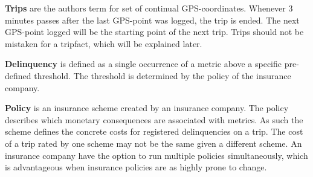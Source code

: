 \textbf{Trips} are the authors term for set of continual GPS-coordinates. Whenever 3 minutes passes after the last GPS-point was logged, the trip is ended. The next GPS-point logged will be the starting point of the next trip. Trips should not be mistaken for a tripfact, which will be explained later.

\textbf{Delinquency} is defined as a single occurrence of a metric above a specific pre-defined threshold. The threshold is determined by the policy of the insurance company.

\textbf{Policy} is an insurance scheme created by an insurance company. The policy describes which monetary consequences are associated with metrics. As such the scheme defines the concrete costs for registered delinquencies on a trip. The cost of a trip rated by one scheme may not be the same given a different scheme. An insurance company have the option to run multiple policies simultaneously, which is advantageous when insurance policies are as highly prone to change. 